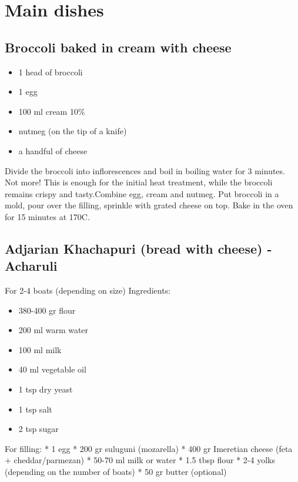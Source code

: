 \documentclass[
]{book}
\providecommand{\tightlist}{%
  \setlength{\itemsep}{0pt}\setlength{\parskip}{0pt}}
\begin{document}
\hypertarget{main-dishes}{%
\chapter{Main dishes}\label{main-dishes}}

\hypertarget{broccoli-baked-in-cream-with-cheese}{%
\section{Broccoli baked in cream with cheese}\label{broccoli-baked-in-cream-with-cheese}}

\begin{itemize}
\tightlist
\item
  1 head of broccoli
\item
  1 egg
\item
  100 ml cream 10\%
\item
  nutmeg (on the tip of a knife)
\item
  a handful of cheese
\end{itemize}

Divide the broccoli into inflorescences and boil in boiling water for 3 minutes. Not more! This is enough for the initial heat treatment, while the broccoli remains crispy and tasty.Combine egg, cream and nutmeg.
Put broccoli in a mold, pour over the filling, sprinkle with grated cheese on top.
Bake in the oven for 15 minutes at 170C.

\hypertarget{adjarian-khachapuri-bread-with-cheese---acharuli}{%
\section{Adjarian Khachapuri (bread with cheese) - Acharuli}\label{adjarian-khachapuri-bread-with-cheese---acharuli}}

For 2-4 boats (depending on size)
Ingredients:

\begin{itemize}
\tightlist
\item
  380-400 gr flour
\item
  200 ml warm water
\item
  100 ml milk
\item
  40 ml vegetable oil
\item
  1 tsp dry yeast
\item
  1 tsp salt
\item
  2 tsp sugar
\end{itemize}

For filling:
* 1 egg
* 200 gr suluguni (mozarella)
* 400 gr Imeretian cheese (feta + cheddar/parmezan)
* 50-70 ml milk or water
* 1.5 tbsp flour
* 2-4 yolks (depending on the number of boats)
* 50 gr butter (optional)
\end{document}
